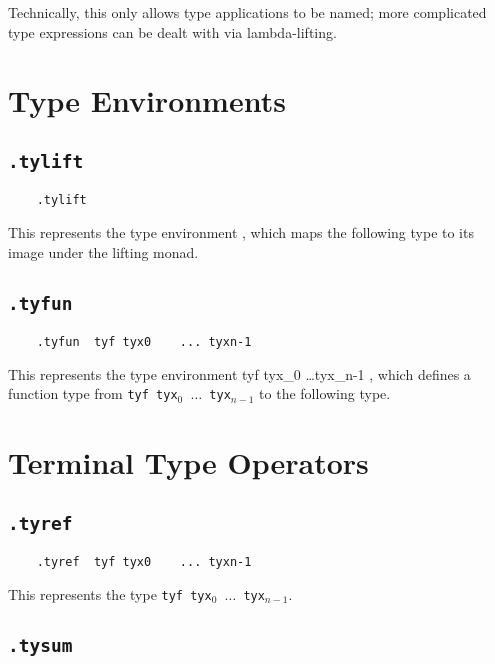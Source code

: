 \documentclass{report}
\newcommand\stringcode[1]{\texttt{#1}}
\begin{document}
Technically, this only allows type applications to be named;
more complicated type expressions can be dealt with via lambda-lifting.

\section{Type Environments}
\label{type_context}

\subsection{\stringcode{.tylift}}

\begin{verbatim}
	.tylift
\end{verbatim}

This represents the type environment \<\lfloor\bullet\rfloor\>, which maps the following type to its image under the lifting monad.

\subsection{\stringcode{.tyfun}}

\begin{verbatim}
	.tyfun	tyf	tyx0	...	tyxn-1
\end{verbatim}

This represents the type environment \<tyf tyx_0 \ldots tyx_{n-1} \to \bullet\>,
which defines a function type from \stringcode{tyf tyx$_0$ $\ldots$ tyx$_{n-1}$} to the following type.

\section{Terminal Type Operators}
\label{type_terminal}

\subsection{\stringcode{.tyref}}

\begin{verbatim}
	.tyref	tyf	tyx0	...	tyxn-1
\end{verbatim}

This represents the type \stringcode{tyf tyx$_0$ $\ldots$ tyx$_{n-1}$}.

\subsection{\stringcode{.tysum}}
\end{document}
